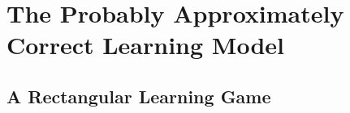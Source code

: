 \chapter{The Probably Approximately Correct Learning Model}
    \section{A Rectangular Learning Game}
